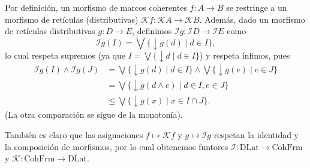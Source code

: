 \documentclass[12pt,letterpaper,titlepage]{article}
\theoremstyle{definition}
\newcommand\Sup{\bigvee}
\newcommand\down{{\downarrow}}
\renewcommand\inf{\wedge}
\renewcommand\cal[1]{\mathcal{#1}}
\newcommand\<{\langle}
\renewcommand\>{\rangle}
\newcommand{\DLat}{\mathrm{DLat}}
\newcommand{\CohFrm}{\mathrm{CohFrm}}
\begin{document}
Por definición, un morfismo de marcos coherentes $f:A\to B$
se restringe a un morfismo de retículas (distributivas)
$\cal Kf:\cal KA\to\cal KB$.
Además, dado un morfismo de retículas distributivas $g:D\to E$,
definimos $\cal Ig:\cal ID\to\cal IE$ como
\[
    \cal Ig(I)
    = \Sup\{\down g(d)\mid d\in I\},
\]
lo cual respeta supremos (ya que $I=\Sup\{\down d\mid d\in I\}$)
y respeta ínfimos, pues
\begin{align*}
    \cal Ig(I)\inf\cal Ig(J)
    &= \Sup\{\down g(d)\mid d\in I\}
        \inf \Sup\{\down g(e)\mid e\in J\} \\
    &= \Sup\{\down g(d\inf e)\mid d\in I, e\in J\} \\
    &\leq \Sup\{\down g(x)\mid x\in I\cap J\}.
\end{align*}
(La otra comparación se sigue de la monotonía).

También es claro que las asignaciones $f\mapsto\cal Kf$
y $g\mapsto\cal Ig$ respetan la identidad y la composición
de morfismos, por lo cual obtenemos funtores
$\cal I:\DLat\to\CohFrm$ y $\cal K:\CohFrm\to\DLat$.
\end{document}

